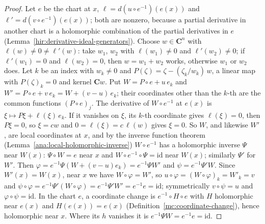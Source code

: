 \begin{proof}
\leanok
Let \(e\) be the chart at \(x\), \(\ell=d(u\circ e^{-1})(e(x))\) and \(\ell'=d(v\circ e^{-1})(e(x))\); both are nonzero, because a partial derivative in
another chart is a holomorphic combination of the partial derivatives in \(e\) (Lemma~\ref{hir:derivative-ideal-generators}). Choose
\(w\in\mathbf C^n\) with \(\ell(w)\ne0\ne\ell'(w)\): take \(w_1\), \(w_2\) with \(\ell(w_1)\ne0\) and \(\ell'(w_2)\ne0\); if \(\ell'(w_1)=0\) and
\(\ell(w_2)=0\), then \(w=w_1+w_2\) works, otherwise \(w_1\) or \(w_2\) does. Let \(k\) be an index with \(w_k\ne0\) and
\(P(\zeta)=\zeta-(\zeta_k/w_k)\,w\), a linear map with \(P(\zeta)_k=0\) and kernel \(\mathbf Cw\). Put \(W=P\circ e+u\,e_k\) and
\(W'=P\circ e+v\,e_k=W+(v-u)\,e_k\); their coordinates other than the \(k\)-th are the common functions \((P\circ e)_j\). The derivative of
\(W\circ e^{-1}\) at \(e(x)\) is \(\xi\mapsto P\xi+\ell(\xi)\,e_k\). If it vanishes on \(\xi\), its \(k\)-th coordinate gives \(\ell(\xi)=0\), then
\(P\xi=0\), so \(\xi=cw\) and \(0=\ell(\xi)=c\,\ell(w)\) gives \(\xi=0\). So \(W\), and likewise \(W'\), are local coordinates at \(x\), and by the
inverse function theorem (Lemma~\ref{ana:local-holomorphic-inverse}) \(W\circ e^{-1}\) has a holomorphic inverse \(\Psi\) near \(W(x)\):
\(\Psi\circ W=e\) near \(x\) and \(W\circ e^{-1}\circ\Psi=\mathrm{id}\) near \(W(x)\); similarly \(\Psi'\) for \(W'\). Then
\(\varphi=e^{-1}\Psi(W+(v-u)e_k)=e^{-1}\Psi W'\) and \(\psi=e^{-1}\Psi'W\). Since \(W'(x)=W(x)\), near \(x\) we have \(W\circ\varphi=W'\), so
\(u\circ\varphi=(W\circ\varphi)_k=W'_k=v\) and \(\psi\circ\varphi=e^{-1}\Psi'(W\circ\varphi)=e^{-1}\Psi'W'=e^{-1}e=\mathrm{id}\); symmetrically
\(v\circ\psi=u\) and \(\varphi\circ\psi=\mathrm{id}\). In the chart \(e\), a coordinate change is \(e^{-1}\circ H\circ e\) with \(H\) holomorphic near \(e(x)\) and
\(H(e(x))=e(x)\) (Definition~\ref{mc:coordinate-change}), hence holomorphic near \(x\). Where its \(h\) vanishes it is \(e^{-1}\Psi W=e^{-1}e=\mathrm{id}\).
\end{proof}

